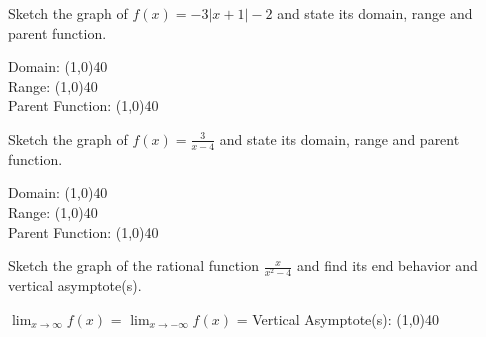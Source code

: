 \documentclass[../main.tex]{subfiles}
\begin{document}
\begin{questions}
    \newpage
    \question[1] Sketch the graph of $f(x) = -3|x+1| - 2$ and state its domain, range and parent function.
    
        \begin{left} 
        \end{left}
        
    Domain: \line(1,0){40} \\
    \newline
    Range: \line(1,0){40} \\
    \newline
    Parent Function: \line(1,0){40} \\
    
    \question[1] Sketch the graph of $f(x) = \frac{3}{x - 4}$ and state its domain, range and parent function.
    
        \begin{left} 
        \end{left}
        
    Domain: \line(1,0){40} \\
    \newline
    Range: \line(1,0){40} \\
    \newline
    Parent Function: \line(1,0){40} \\
    
    \question[1] Sketch the graph of the rational function $\frac{x}{x^2 - 4}$ and find its end behavior and vertical asymptote(s).
    
        \begin{left} 
        \end{left}
    
    $\lim_{x\to\infty} f(x)$ =
    \newline    
    $\lim_{x\to-\infty} f(x)$ =
    \newline
    Vertical Asymptote(s): \line(1,0){40} \\
    

\end{questions}
\end{document}
